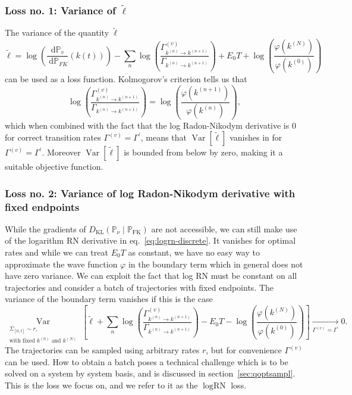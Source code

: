 \subsubsection{Loss no. 1: Variance of $\tilde \ell$}
The variance of the quantity $\tilde{\ell}$
\begin{equation}
	\tilde{\ell}=
	\log \left(\frac{\mathrm{d} \mathbb{P}_{v}}{\mathrm{~d} \mathbb{P}_{F K}}(k(t))\right)
	-\sum_{n} \log \left(\frac{\Gamma^{(v)}_{k^{(n)} \rightarrow k^{(n+1)}}}{\Gamma_{k^{(n)} \rightarrow k^{(n+1)}}}\right)
	+E_{0} T
	+\log \left(\frac{\varphi\left(k^{(N)}\right)}{\varphi\left(k^{(0)}\right)}\right)
\end{equation}
 can be used as a loss function. Kolmogorov's criterion tells us that
 \begin{equation}
 	\log \left(\frac{\Gamma_{k^{(n)} \rightarrow k^{(n+1)}}^{(v)}}{\Gamma_{k^{(n)} \rightarrow k^{(n+1)}}}\right)=\log \left(\frac{\varphi(k^{(n+1)})}{\varphi(k^{(n)})}\right),
 \end{equation}
 which when combined with the fact that the log Radon-Nikodym derivative is $0$ for correct transition rates $\Gamma^{(v)} = \Gamma^\prime$, means that $\operatorname{Var}[\tilde{\ell}]$ vanishes in for $\Gamma^{(v)} = \Gamma^\prime$. Moreover $\operatorname{Var}[\tilde \ell]$ is bounded from below by zero, making it a suitable objective function. 
 
\subsubsection{Loss no. 2: Variance of log Radon-Nikodym derivative with fixed endpoints}
While the gradients of $D_{\mathrm{KL}}\left(\mathbb{P}_{\nu} \mid \mathbb{P}_{\mathrm{FK}}\right)$ are not accessible, we can still make use of the logarithm RN derivative in eq.~\eqref{eq:logrn-discrete}. It vanishes for optimal rates and while we can treat $E_0 T$ as constant, we have no easy way to approximate the wave function $\varphi$ in the boundary term which in general does not have zero variance. We can exploit the fact that log RN must be constant on all trajectories and consider a batch of trajectories with fixed endpoints. The variance of the boundary term vanishes if this is the case
\begin{equation}
\underset{\substack{\Sigma_{[0, t]} \sim r, \\ \text{with fixed } k^{(0)} \text{ and } k^{(N)}}}{\operatorname{Var}}\left[\tilde \ell
+\sum_{n} \log \left(\frac{\Gamma_{k^{(n)} \rightarrow k^{(n+1)}}^{(v)}}{\Gamma_{k^{(n)} \rightarrow k^{(n+1)}}}\right)-E_{0} T-\log \left(\frac{\varphi(k^{(N)})}{\varphi(k^{(0)})}\right)
\right] \underset{\Gamma^{(v)} = \Gamma^\prime}{\rightarrow} 0.
\end{equation}
The trajectories can be sampled using arbitrary rates $r$, but for convenience $\Gamma^{(v)}$ can be used. How to obtain a batch poses a technical challenge which is to be solved on a system by system basis, and is discussed in section~\ref{sec:qoptsampl}. This is the loss we focus on, and we refer to it as the $\log \text{RN}$ loss. 
